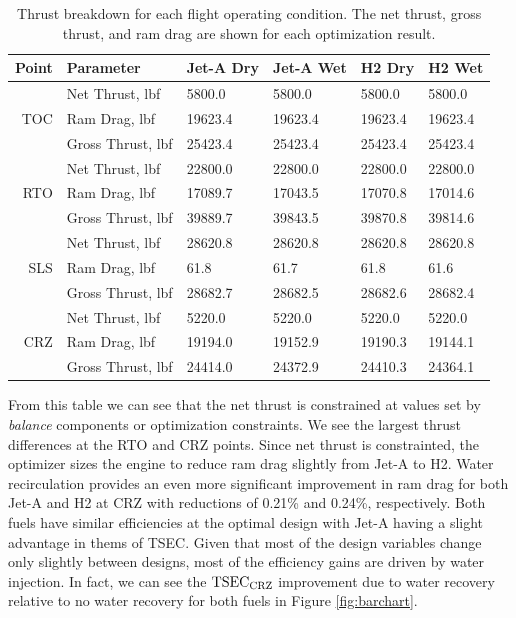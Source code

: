 \documentclass[conf]{new-aiaa}
\begin{document}
\begin{table}[hbt!]
    \centering
    \caption{Thrust breakdown for each flight operating condition.
        The net thrust, gross thrust, and ram drag are shown for each optimization result.
    }
    \small
    \renewcommand{\arraystretch}{1.2}
    \begin{tabular}{r l l l l l}
        Point & Parameter              & Jet-A Dry & Jet-A Wet & H2 Dry  & H2 Wet  \\
        \toprule
              & Net Thrust, \si{lbf}   & 5800.0    & 5800.0    & 5800.0  & 5800.0  \\
        TOC   & Ram Drag, \si{lbf}     & 19623.4   & 19623.4   & 19623.4 & 19623.4 \\
              & Gross Thrust, \si{lbf} & 25423.4   & 25423.4   & 25423.4 & 25423.4 \\
        \hline
              & Net Thrust, \si{lbf}   & 22800.0   & 22800.0   & 22800.0 & 22800.0 \\
        RTO   & Ram Drag, \si{lbf}     & 17089.7   & 17043.5   & 17070.8 & 17014.6 \\
              & Gross Thrust, \si{lbf} & 39889.7   & 39843.5   & 39870.8 & 39814.6 \\
        \hline
              & Net Thrust, \si{lbf}   & 28620.8   & 28620.8   & 28620.8 & 28620.8 \\
        SLS   & Ram Drag, \si{lbf}     & 61.8      & 61.7      & 61.8    & 61.6    \\
              & Gross Thrust, \si{lbf} & 28682.7   & 28682.5   & 28682.6 & 28682.4 \\
        \hline
              & Net Thrust, \si{lbf}   & 5220.0    & 5220.0    & 5220.0  & 5220.0  \\
        CRZ   & Ram Drag, \si{lbf}     & 19194.0   & 19152.9   & 19190.3 & 19144.1 \\
              & Gross Thrust, \si{lbf} & 24414.0   & 24372.9   & 24410.3 & 24364.1 \\
        \bottomrule
    \end{tabular}
    \label{tab:thrust}
\end{table}

From this table we can see that the net thrust is constrained at values set by \emph{balance} components or optimization constraints.
We see the largest thrust differences at the RTO and CRZ points.
Since net thrust is constrainted, the optimizer sizes the engine to reduce ram drag slightly from Jet-A to H2.
Water recirculation provides an even more significant improvement in ram drag for both Jet-A and H2 at CRZ with reductions of 0.21\% and 0.24\%, respectively.
Both fuels have similar efficiencies at the optimal design with Jet-A having a slight advantage in thems of TSEC.
Given that most of the design variables change only slightly between designs, most of the efficiency gains are driven by water injection.
In fact, we can see the $\rm{TSEC}_{\rm{CRZ}}$ improvement due to water recovery relative to no water recovery for both fuels in Figure \ref{fig:barchart}.
\end{document}
